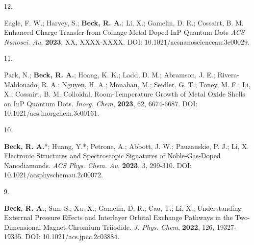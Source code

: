 

\begin{cvpublications}


\cvpublication
{12.}
{\parbox[t]{0.95\textwidth}{\strut Eagle, F. W.; Harvey, S.; \textbf{Beck, R. A.}; Li, X.; Gamelin, D. R.; Cossairt, B. M.
Enhanced Charge Transfer from Coinage Metal Doped InP Quantum Dots
\textit{ACS Nanosci. Au}, \textbf{2023}, XX, XXXX-XXXX.
DOI: 10.1021/acsnanoscienceau.3c00029.}}



\cvpublication
{11.}
{\parbox[t]{0.95\textwidth}{\strut Park, N.; \textbf{Beck, R. A.}; Hoang, K. K.; Ladd, D. M.; Abramson, J. E.; Rivera-Maldonado, R. A.; Nguyen, H. A.; Monahan, M.; Seidler, G. T.; Toney, M. F.; Li, X.; Cossairt, B. M.
Colloidal, Room-Temperature Growth of Metal Oxide Shells on InP Quantum Dots.
\textit{Inorg. Chem}, \textbf{2023}, 62, 6674-6687.
DOI: 10.1021/acs.inorgchem.3c00161.}}



\cvpublication
{10.}
{\parbox[t]{0.95\textwidth}{\strut \textbf{Beck, R. A.}*; Huang, Y.*; Petrone, A.; Abbott, J. W.; Pauzauskie, P. J.; Li, X.
Electronic Structures and Spectroscopic Signatures of Noble-Gas-Doped Nanodiamonds.
\textit{ACS Phys. Chem. Au}, \textbf{2023}, 3, 299-310.
DOI: 10.1021/acsphyschemau.2c00072.}}



\cvpublication
{9.}
{\parbox[t]{0.95\textwidth}{\strut \textbf{Beck, R. A.}; Sun, S.; Xu, X.; Gamelin, D. R.; Cao, T.; Li, X.,
Understanding Exterrnal Pressure Effects and Interlayer Orbital Exchange Pathways in the Two-Dimensional Magnet-Chromium Triiodide.
\textit{J. Phys. Chem}, \textbf{2022}, 126, 19327-19335.
DOI: 10.1021/acs.jpcc.2c03884.}}


\end{cvpublications}
